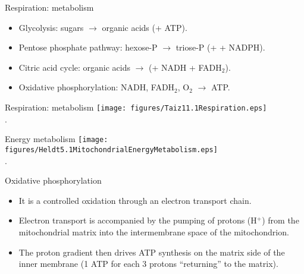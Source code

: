 \documentclass[10pt]{beamer}
\begin{document}
\begin{frame}{Respiration: metabolism}
    \begin{itemize}
        \item Glycolysis: sugars $\rightarrow$ organic acids (+ ATP).
        \item Pentose phosphate pathway: hexose-P $\rightarrow$
        triose-P (+ \COtwo + NADPH).
        \item Citric acid cycle: organic acids $\rightarrow$
        (\COtwo + NADH + FADH$_2$).
        \item Oxidative phosphorylation: NADH, FADH$_2$, O$_2$
        $\rightarrow$ ATP.
    \end{itemize}
\end{frame}

\begin{frame}{Respiration: metabolism}
    \centering
    \texttt{[image: figures/Taiz11.1Respiration.eps]}\\
    {\small \autocite[from][]{TaiZei2006}.}
\end{frame}

\begin{frame}{Energy metabolism}
    \centering
    \texttt{[image: figures/Heldt5.1MitochondrialEnergyMetabolism.eps]}\\
    {\small \autocite[from][]{Heldt1997}.}
\end{frame}

\begin{frame}{Oxidative phosphorylation}
    \begin{itemize}
        \item It is a controlled oxidation through an electron
        transport chain.
        \item Electron transport is accompanied by the pumping of
        protons (H$^+$) from the mitochondrial matrix into the intermembrane
        space of the mitochondrion.
        \item The proton gradient then drives ATP synthesis on
        the matrix side of the inner membrane (1 ATP for each 3
        protons ``returning'' to the matrix).
    \end{itemize}
\end{frame}
\end{document}
